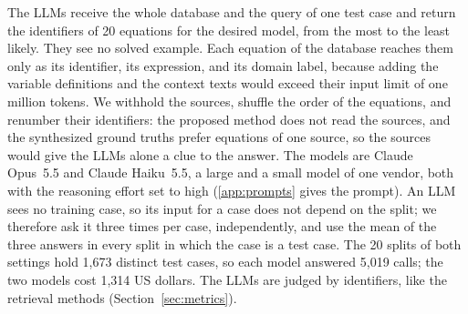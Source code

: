 The LLMs receive the whole database and the query of one test case and return the identifiers of
20 equations for the desired model, from the most to the least likely. They see no solved
example. Each equation of the database reaches them only as its identifier, its expression, and
its domain label, because adding the variable definitions and the context texts would exceed their
input limit of one million tokens. We withhold the sources, shuffle the order of the equations,
and renumber their identifiers: the proposed method does not read the sources, and the synthesized
ground truths prefer equations of one source, so the sources would give the LLMs alone a clue to
the answer. The models are Claude Opus~5.5 and Claude Haiku~5.5, a large and a small model of one
vendor, both with the reasoning effort set to high (\ref{app:prompts} gives the prompt). An LLM
sees no training case, so its input for a case does not depend on the split; we therefore ask it
three times per case, independently, and use the mean of the three answers in every split in which
the case is a test case. The 20 splits of both settings hold 1,673 distinct test cases, so each
model answered 5,019 calls; the two models cost 1,314 US dollars. The LLMs are judged by
identifiers, like the retrieval methods (Section~\ref{sec:metrics}).

